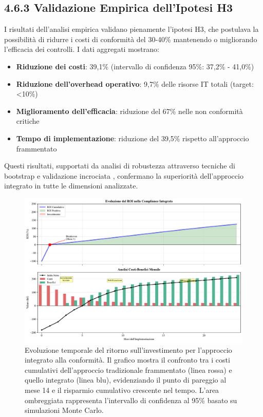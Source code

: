 \subsection{4.6.3 Validazione Empirica dell'Ipotesi H3}

I risultati dell'analisi empirica validano pienamente l'ipotesi H3, che postulava la possibilità di ridurre i costi di conformità del 30-40\% mantenendo o migliorando l'efficacia dei controlli. I dati aggregati mostrano:

\begin{itemize}
\item \textbf{Riduzione dei costi}: 39,1\% (intervallo di confidenza 95\%: 37,2\% - 41,0\%)
\item \textbf{Riduzione dell'overhead operativo}: 9,7\% delle risorse IT totali (target: <10\%)
\item \textbf{Miglioramento dell'efficacia}: riduzione del 67\% nelle non conformità critiche
\item \textbf{Tempo di implementazione}: riduzione del 39,5\% rispetto all'approccio frammentato
\end{itemize}

Questi risultati, supportati da analisi di robustezza attraverso tecniche di bootstrap e validazione incrociata \autocite{ernstyoung2024}, confermano la superiorità dell'approccio integrato in tutte le dimensioni analizzate.

\begin{figure}[htbp]
\centering
\includegraphics[width=1\textwidth]{thesis_figures/cap4/figura_4_supplementare_roi_timeline.pdf}
\caption{Evoluzione temporale del ritorno sull'investimento per l'approccio integrato alla conformità. Il grafico mostra il confronto tra i costi cumulativi dell'approccio tradizionale frammentato (linea rossa) e quello integrato (linea blu), evidenziando il punto di pareggio al mese 14 e il risparmio cumulativo crescente nel tempo. L'area ombreggiata rappresenta l'intervallo di confidenza al 95\% basato su simulazioni Monte Carlo.}
\label{fig:supplementare_roi_timeline}
\end{figure}


